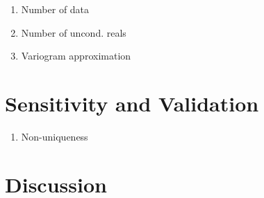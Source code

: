 \begin{enumerate}[noitemsep]
    \item Number of data
    \item Number of uncond. reals
    \item Variogram approximation
\end{enumerate}


\FloatBarrier
\section{Sensitivity and Validation}
\label{sec:04valid}

\begin{enumerate}[noitemsep]
    \item Non-uniqueness
\end{enumerate}


\FloatBarrier
\section{Discussion}
\label{sec:04discuss}